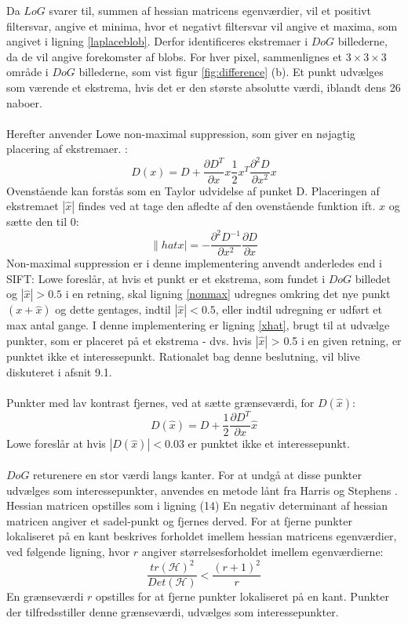 Da $LoG$ svarer til, summen af hessian matricens egenværdier, vil et positivt filtersvar, angive et minima, hvor et negativt filtersvar vil angive et maxima, som angivet i ligning \eqref{laplaceblob}. Derfor identificeres ekstremaer i $DoG$ billederne, da de vil angive forekomster af blobs. For hver pixel, sammenlignes et $3\times3\times3$ område i $DoG$ billederne, som vist figur \ref{fig:difference} (b). Et punkt udvælges som værende et ekstrema, hvis det er den største absolutte værdi, iblandt dens 26 naboer.
\\
\\
Herefter anvender Lowe non-maximal suppression, som giver en nøjagtig placering af ekstremaer. \cite{nonmaximalsuppression}:
\begin{equation}
D(x)=D+\dfrac{\partial D^T}{\partial x}x\dfrac{1}{2}x^T\dfrac{\partial^2D}{\partial x^2}x
\label{nonmax}
\end{equation}
Ovenstående kan forstås som en Taylor udvidelse af punket D.
Placeringen af ekstremaet $|\hat{x}|$ findes ved at tage den afledte af den ovenstående funktion ift. $x$ og sætte den til 0:
\begin{equation}
\|hat{x}|= -\dfrac{\partial^2 D^{-1}}{\partial x^2}\dfrac{\partial D}{\partial x}
\label{xhat}
\end{equation}
Non-maximal suppression er i denne implementering anvendt anderledes end i SIFT: Lowe foreslår, at hvis et punkt er et ekstrema, som fundet i $DoG$ billedet og $|\hat{x}| > 0.5$ i en retning, skal ligning \eqref{nonmax} udregnes omkring det nye punkt $(x+\hat{x})$ og dette gentages, indtil $|\hat{x}| < 0.5$, eller indtil udregning er udført et max antal gange. I denne implementering er ligning \eqref{xhat}, brugt til at udvælge punkter, som er placeret på et ekstrema - dvs. hvis $|\hat{x}|$ > 0.5 i en given retning, er punktet ikke et interessepunkt.  Rationalet bag denne beslutning, vil blive diskuteret i afsnit 9.1.
\\
\\
Punkter med lav kontrast fjernes, ved at sætte grænseværdi, for $D(\hat{x})$:
\begin{equation}
D(\hat{x})=D+\dfrac{1}{2}\dfrac{\partial D^T}{\partial x}\hat{x}
\label{dxhat}
\end{equation}
Lowe foreslår at hvis $|D(\hat{x})|<0.03$ er punktet ikke et interessepunkt. \\ \\
$DoG$ returenere en stor værdi langs kanter. For at undgå at disse punkter udvælges som interessepunkter, anvendes en metode lånt fra Harris og Stephens \cite{harris}. Hessian matricen opstilles som i ligning (14)
En negativ determinant af hessian matricen angiver et sadel-punkt og fjernes derved. For at fjerne punkter lokaliseret på en kant beskrives forholdet imellem hessian matricens egenværdier, ved følgende ligning, hvor $r$ angiver størrelsesforholdet imellem egenværdierne:
\begin{equation}
\dfrac{tr(\mathcal{H})^2}{Det(\mathcal{H})}<\dfrac{(r+1)^2}{r}
\label{rval}
\end{equation}
En grænseværdi $r$ opstilles for at fjerne punkter lokaliseret på en kant. Punkter der tilfredsstiller denne grænseværdi, udvælges som interessepunkter.
